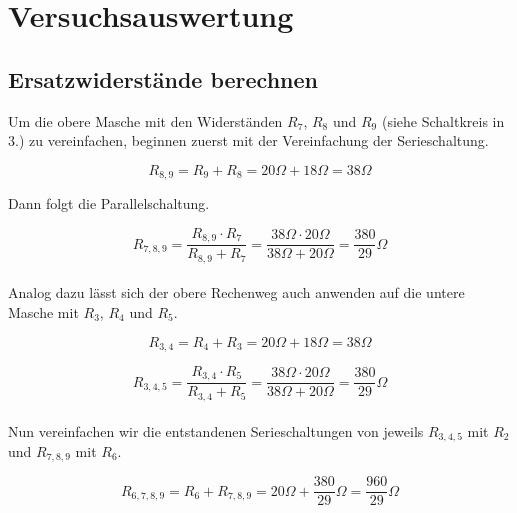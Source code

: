 \documentclass[a4paper,12pt]{article}
\begin{document}

\newpage

\section{Versuchsauswertung}

\subsection{Ersatzwiderstände berechnen}

Um die obere Masche mit den Widerständen $R_7$, $R_8$ und $R_9$ (siehe Schaltkreis in 3.) zu vereinfachen, beginnen zuerst mit der Vereinfachung der Serieschaltung.

$$R_{8,9} = R_9 + R_8 = 20 \Omega + 18 \Omega = 38 \Omega$$

Dann folgt die Parallelschaltung.

$$R_{7,8,9} = \frac{R_{8,9} \cdot R_7}{R_{8,9} + R_7} = \frac{38 \Omega \cdot 20 \Omega}{38 \Omega + 20 \Omega} = \frac{380}{29}\Omega$$\\

Analog dazu lässt sich der obere Rechenweg auch anwenden auf die untere Masche mit $R_3$, $R_4$ und $R_5$.

$$R_{3,4} = R_4 + R_3 = 20 \Omega + 18 \Omega = 38 \Omega$$

$$R_{3,4,5} = \frac{R_{3,4} \cdot R_5}{R_{3,4} + R_5} = \frac{38 \Omega \cdot 20 \Omega}{38 \Omega + 20 \Omega} = \frac{380}{29}\Omega$$\\

Nun vereinfachen wir die entstandenen Serieschaltungen von jeweils $R_{3,4,5}$ mit $R_2$ und $R_{7,8,9}$ mit $R_6$.

$$R_{6,7,8,9} = R_6 + R_{7,8,9} = 20 \Omega + \frac{380}{29} \Omega = \frac{960}{29} \Omega$$
\end{document}
